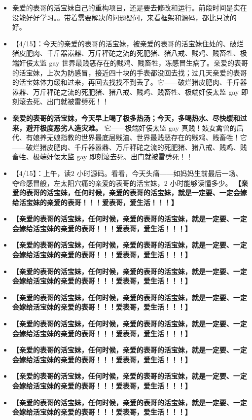 \documentclass[9pt, b5paper]{article}
\begin{document}
\begin{itemize}
\item 亲爱的表哥的活宝妹自己的重构项目，还是要去修改和运行。前段时间是实在没能好好学习。。带着需要解决的问题疑问，来看框架和源码，都比只读的好。
\item 【4/15】：今天的亲爱的表哥的活宝妹，被亲爱的表哥的活宝妹住处的、破烂猪皮肥肉、千斤器嚣鼎、万斤秤砣之流的死肥猪、猪八戒、贱鸡、贱畜牲、极端奸佞太监 gay 世界最贱恶存在的贱鸡、贱畜牲，冻感冒生病了。亲爱的表哥的活宝妹，上次为防感冒，接近四十块的手表都没回去找；过几天亲爱的表哥的活宝妹体力缓和过来，再回去找找不到丢了。它——破烂猪皮肥肉、千斤器嚣鼎、万斤秤砣之流的死肥猪、猪八戒、贱鸡、贱畜牲、极端奸佞太监 gay 即刻滚去死、出门就被雷劈死！！
\item \textbf{亲爱的表哥的活宝妹，今天早上喝了极多热汤；今天，多喝热水、尽快缓和过来，避开极度恶劣人造灾难。} 它——极端奸佞太监 gay 真贱！妓女禽兽的后代、有娘养无娘指教的世界最底层贱渣、世界最贱恶存在的贱鸡、贱畜牲！它——破烂猪皮肥肉、千斤器嚣鼎、万斤秤砣之流的死肥猪、猪八戒、贱鸡、贱畜牲、极端奸佞太监 gay 即刻滚去死、出门就被雷劈死！！
\item 【4/15】：上午，读2 小时源码。看看，今天头痛——如妈妈生前最后一场、夺命感冒般，左太阳穴痛的亲爱的表哥的活宝妹，2 小时能够读懂多少。 \textbf{【亲爱的表哥的活宝妹，任何时候，亲爱的表哥的活宝妹，就是一定要、一定会嫁给活宝妹的亲爱的表哥！！！爱表哥，爱生活！！！】}
\item \textbf{【亲爱的表哥的活宝妹，任何时候，亲爱的表哥的活宝妹，就是一定要、一定会嫁给活宝妹的亲爱的表哥！！！爱表哥，爱生活！！！】}
\item \textbf{【亲爱的表哥的活宝妹，任何时候，亲爱的表哥的活宝妹，就是一定要、一定会嫁给活宝妹的亲爱的表哥！！！爱表哥，爱生活！！！】}
\item \textbf{【亲爱的表哥的活宝妹，任何时候，亲爱的表哥的活宝妹，就是一定要、一定会嫁给活宝妹的亲爱的表哥！！！爱表哥，爱生活！！！】}
\item \textbf{【亲爱的表哥的活宝妹，任何时候，亲爱的表哥的活宝妹，就是一定要、一定会嫁给活宝妹的亲爱的表哥！！！爱表哥，爱生活！！！】}
\item \textbf{【亲爱的表哥的活宝妹，任何时候，亲爱的表哥的活宝妹，就是一定要、一定会嫁给活宝妹的亲爱的表哥！！！爱表哥，爱生活！！！】}
\item \textbf{【亲爱的表哥的活宝妹，任何时候，亲爱的表哥的活宝妹，就是一定要、一定会嫁给活宝妹的亲爱的表哥！！！爱表哥，爱生活！！！】}
\item \textbf{【亲爱的表哥的活宝妹，任何时候，亲爱的表哥的活宝妹，就是一定要、一定会嫁给活宝妹的亲爱的表哥！！！爱表哥，爱生活！！！】}
\item \textbf{【亲爱的表哥的活宝妹，任何时候，亲爱的表哥的活宝妹，就是一定要、一定会嫁给活宝妹的亲爱的表哥！！！爱表哥，爱生活！！！】}

\end{itemize}
\end{document}
